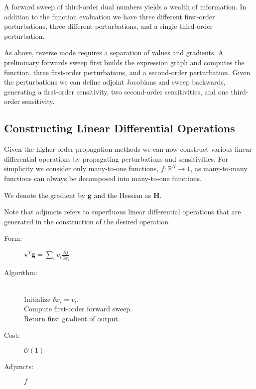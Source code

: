 A forward sweep of third-order dual numbers yields a wealth of information.  In addition
to the function evaluation we have three different first-order perturbations, three different 
perturbations, and a single third-order perturbation.

As above, reverse mode requires a separation of values and gradients.  A
preliminary forwards sweep first builds the expression graph and computes the
function, three first-order perturbations, and a second-order perturbation.  Given 
the perturbations we can define adjoint Jacobians and sweep backwards, generating 
a first-order sensitivity, two second-order sensitivities, and one third-order sensitivity.

\subsection{Constructing Linear Differential Operations}

Given the higher-order propagation methods we can now construct various linear 
differential operations by propagating perturbations and sensitivities.  For simplicity
we consider only many-to-one functions, $f : \mathbb{R}^{N} \rightarrow 1$, as
many-to-many functions can always be decomposed into many-to-one functions.

We denote the gradient by $\mathbf{g}$ and the Hessian as $\mathbf{H}$.

Note that adjuncts refers to superfluous linear differential operations that are generated 
in the construction of the desired operation.

\begin{tcolorbox}[colback=white,colframe=gray90, coltitle=black,boxrule=3pt,
fonttitle=\bfseries,title=Directional Derivative]

	\begin{description}
		\item[Form:] $\displaystyle \mathbf{v}^{T} \mathbf{g} = \sum_{i} v_{i} \frac{ \partial f }{ \partial x_{i} } $
		\item[Algorithm:] \hfill \\
		Initialize $\delta x_{i} = v_{i}$. \\
		Compute first-order forward sweep. \\
		Return first gradient of output.
		\item[Cost:] $\mathcal{O} \! \left( 1 \right)$
		\item[Adjuncts:] $ f $
	\end{description}
	
\end{tcolorbox}


